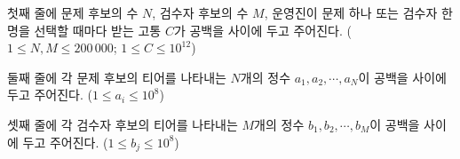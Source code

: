 첫째 줄에 문제 후보의 수 $N$, 검수자 후보의 수 $M$, 운영진이 문제 하나 또는 검수자 한 명을 선택할 때마다 받는 고통 $C$가 공백을 사이에 두고 주어진다. ($1 \le N,M \le 200\,000$; $1 \le C \le 10^{12}$)

둘째 줄에 각 문제 후보의 티어를 나타내는 $N$개의 정수 $a_1,a_2,\cdots,a_N$이 공백을 사이에 두고 주어진다. ($1 \le a_i \le 10^8$)

셋째 줄에 각 검수자 후보의 티어를 나타내는 $M$개의 정수 $b_1,b_2,\cdots,b_M$이 공백을 사이에 두고 주어진다. ($1 \le b_j \le 10^8$)